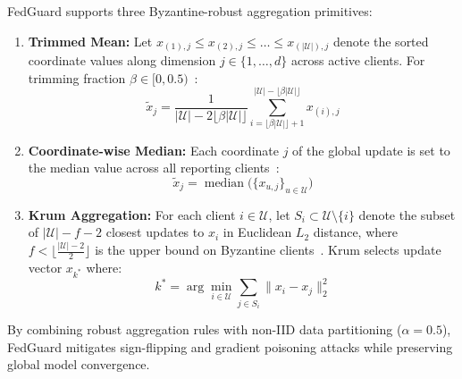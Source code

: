 FedGuard supports three Byzantine-robust aggregation primitives:
\begin{enumerate}
    \item \textbf{Trimmed Mean:} Let $x_{(1), j} \le x_{(2), j} \le \dots \le x_{(|\mathcal{U}|), j}$ denote the sorted coordinate values along dimension $j \in \{1, \dots, d\}$ across active clients. For trimming fraction $\beta \in [0, 0.5)$~\cite{yin2018byzantine}:
    \begin{equation}
        \tilde{x}_j = \frac{1}{|\mathcal{U}| - 2\lfloor \beta |\mathcal{U}| \rfloor} \sum_{i = \lfloor \beta |\mathcal{U}| \rfloor + 1}^{|\mathcal{U}| - \lfloor \beta |\mathcal{U}| \rfloor} x_{(i), j}
    \end{equation}
    \item \textbf{Coordinate-wise Median:} Each coordinate $j$ of the global update is set to the median value across all reporting clients~\cite{yin2018byzantine}:
    \begin{equation}
        \tilde{x}_j = \operatorname{median}\Big( \{ x_{u, j} \}_{u \in \mathcal{U}} \Big)
    \end{equation}
    \item \textbf{Krum Aggregation:} For each client $i \in \mathcal{U}$, let $S_i \subset \mathcal{U} \setminus \{i\}$ denote the subset of $|\mathcal{U}| - f - 2$ closest updates to $x_i$ in Euclidean $L_2$ distance, where $f < \lfloor \frac{|\mathcal{U}| - 2}{2} \rfloor$ is the upper bound on Byzantine clients~\cite{blanchard2017machine}. Krum selects update vector $x_{k^*}$ where:
    \begin{equation}
        k^* = \arg\min_{i \in \mathcal{U}} \sum_{j \in S_i} \| x_i - x_j \|_2^2
    \end{equation}
\end{enumerate}
By combining robust aggregation rules with non-IID data partitioning ($\alpha=0.5$), FedGuard mitigates sign-flipping and gradient poisoning attacks while preserving global model convergence.
